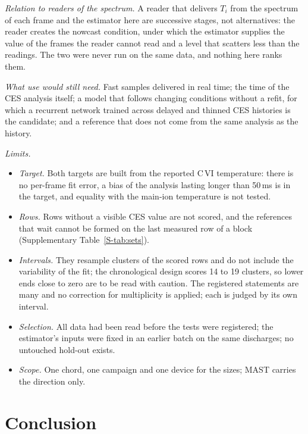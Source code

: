 \documentclass[11pt,a4paper]{article}
\newcommand{\Ti}{\ensuremath{T_i}}
\newcommand{\SuppTab}[1]{Supplementary Table~\ref{S-#1}}
\begin{document}
\emph{Relation to readers of the spectrum.} A reader that delivers \Ti{} from the
spectrum of each frame and the estimator here are successive stages, not alternatives:
the reader creates the nowcast condition, under which the estimator supplies the value of
the frames the reader cannot read and a level that scatters less than the readings. The
two were never run on the same data, and nothing here ranks them.

\emph{What use would still need.} Fast samples delivered in real time; the time of the
CES analysis itself; a model that follows changing conditions without a refit, for which
a recurrent network trained across delayed and thinned CES histories is the candidate;
and a reference that does not come from the same analysis as the history.

\emph{Limits.}
\begin{itemize}\setlength{\itemsep}{1pt}\setlength{\parskip}{0pt}
\item \emph{Target.} Both targets are built from the reported C\,VI temperature: there is
no per-frame fit error, a bias of the analysis lasting longer than 50\,ms is in the
target, and equality with the main-ion temperature is not tested.
\item \emph{Rows.} Rows without a visible CES value are not scored, and the references
that wait cannot be formed on the last measured row of a block (\SuppTab{tab:sets}).
\item \emph{Intervals.} They resample clusters of the scored rows and do not include the
variability of the fit; the chronological design scores 14 to 19 clusters, so lower ends
close to zero are to be read with caution. The registered statements are many and no
correction for multiplicity is applied; each is judged by its own interval.
\item \emph{Selection.} All data had been read before the tests were registered; the
estimator's inputs were fixed in an earlier batch on the same discharges; no untouched
hold-out exists.
\item \emph{Scope.} One chord, one campaign and one device for the sizes; MAST carries
the direction only.
\end{itemize}

\section{Conclusion}
\label{sec:conclusion}
\end{document}
